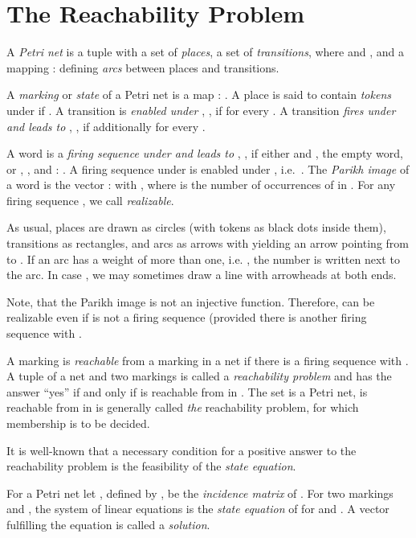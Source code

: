 \documentclass{LMCS}
\begin{document}
\section{The Reachability Problem}\label{sec2}

\begin{defi}
A {\em Petri net}  is a tuple  with a set  of {\em places}, a set  of {\em transitions},
where  and , and a mapping : 
defining {\em arcs} between places and transitions.

A {\em marking} or {\em state} of a Petri net is a map : . A place  is said to contain 
{\em tokens} under  if . A transition  is 
{\em enabled under }, , if  for every . A transition 
{\em fires under  and leads to }, , if additionally 
for every .

A word  is a {\em firing sequence under  and leads to }, ,
if either  and , the empty word, or , , 
and : . A firing sequence  under  is enabled under ,
i.e.\ . The {\em Parikh image} of a word  is the vector
:  with , where  is the number of
occurrences of  in . For any firing sequence , we call  {\em realizable}.
\end{defi}

As usual, places are drawn as circles (with tokens as black dots inside them), transitions as rectangles, 
and arcs as arrows with  yielding an arrow pointing from  to . If an arc has a weight of
more than one, i.e. , the number  is written next to the arc. In case ,
we may sometimes draw a line with arrowheads at both ends.

Note, that the Parikh image is not an injective function. Therefore,  can be realizable
even if  is not a firing sequence (provided there is another firing sequence 
with .

\begin{defi}
A marking  is {\em reachable} from a marking  in a net  if there is a firing sequence 
 with . A tuple  of a net and two markings is called a
{\em reachability problem} and has the answer ``yes'' if and only if  is reachable from  in .
The set  is a Petri net,  is reachable from  in  is generally 
called {\em the} reachability problem, for which membership is to be decided.
\end{defi}

It is well-known that a necessary condition for a positive
answer to the reachability problem is the feasibility of the {\em state equation}.

\begin{defi}
For a Petri net  let , defined by , be the
{\em incidence matrix} of . For two markings  and , the system of linear equations
 is the {\em state equation} of  for  and . A vector  fulfilling
the equation is called a {\em solution}.
\end{defi}
\end{document}
